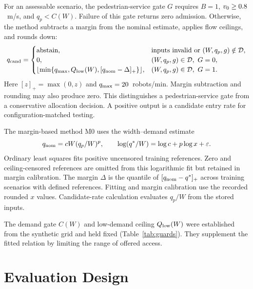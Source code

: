 \documentclass[NewProceedings,letterpaper]{ascelike-new}
\begin{document}
For an assessable scenario, the pedestrian-service gate $G$ requires $B=1$, $v_0\geq0.8{}$~m/s, and $q_p<C(W)$. Failure of this gate returns zero admission. Otherwise, the method subtracts a margin from the nominal estimate, applies flow ceilings, and rounds down:
\begin{equation}
q_{\rm cand}=
\begin{cases}
\text{abstain},&\text{inputs invalid or }(W,q_p,g)\notin\mathcal D,\\
0,&(W,q_p,g)\in\mathcal D,\ G=0,\\
\lfloor\min\{q_{\max},Q_{\rm low}(W),[q_{\rm nom}-\Delta]_+\}\rfloor,
 &(W,q_p,g)\in\mathcal D,\ G=1.
\end{cases}
\label{eq:quota}
\end{equation}
Here $[z]_+=\max(0,z)$ and $q_{\max}=20{}$~robots/min. Margin subtraction and rounding may also produce zero. This distinguishes a pedestrian-service gate from a conservative allocation decision. A positive output is a candidate entry rate for configuration-matched testing.

The margin-based method M0 uses the width--demand estimate
\begin{equation}
 q_{\rm nom}=cW(q_p/W)^p,\qquad
 \log(q^*/W)=\log c+p\log x+\varepsilon.
 \label{eq:nominal}
\end{equation}
Ordinary least squares fits positive uncensored training references. Zero and ceiling-censored references are omitted from this logarithmic fit but retained in margin calibration. The margin $\Delta$ is the \Quantile{} quantile of $[q_{\rm nom}-q^*]_+$ across training scenarios with defined references. Fitting and margin calibration use the recorded rounded $x$ values. Candidate-rate calculation evaluates $q_p/W$ from the stored inputs.

\begin{table}[!htbp]
\centering\caption{Demand gate and low-demand ceiling, interpolated linearly between width knots.}
\label{tab:guards}
\end{table}
The demand gate $C(W)$ and low-demand ceiling $Q_{\rm low}(W)$ were established from the synthetic grid and held fixed (Table~\ref{tab:guards}). They supplement the fitted relation by limiting the range of offered access.

\section{Evaluation Design}
\end{document}
